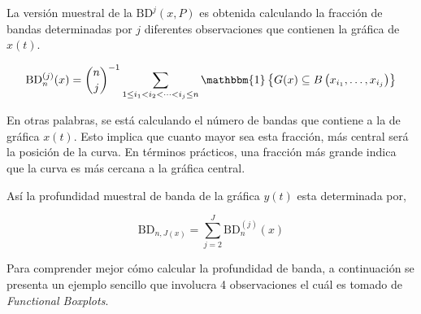 La versión muestral de la $\mathrm{BD}^{j}(x, P)$ es obtenida calculando la fracción de bandas determinadas por $j$ diferentes observaciones que contienen la gráfica de $x(t)$.

\begin{equation}
    \mathrm{BD}_n^{(j)}(x)= \binom{n}{j}^{-1} \sum_{1 \leq i_1<i_2<\cdots<i_j \leq n} \mathbbm{1}\left\{G(x) \subseteq B\left(x_{i_1}, \ldots, x_{i_j}\right)\right\}
\end{equation}

En otras palabras, se está calculando el número de bandas que contiene a la de gráfica $x(t)$. Esto implica que cuanto mayor sea esta fracción, más central será la posición de la curva. En términos prácticos, una fracción más grande indica que la curva es más cercana a la gráfica central.

Así la profundidad muestral de banda de la gráfica $y(t)$ esta determinada por, 

\begin{equation}
    \mathrm{BD}_{n, J(x)} = \sum_{j = 2}^{J} \mathrm{BD}_n^{(j)}(x)
\end{equation}

Para comprender mejor cómo calcular la profundidad de banda, a continuación se presenta un ejemplo sencillo que involucra 4 observaciones el cuál es tomado de \textit{Functional Boxplots}\cite{boxplotFun}.

